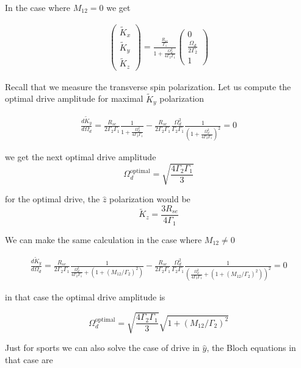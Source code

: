 \documentclass{article}
\begin{document}
In the case where $M_{12}=0$ we get

\begin{align}
    \left(\begin{array}{c}
        \tilde{K}_{x}\\
        \tilde{K}_{y}\\
        \tilde{K}_{z} 
    \end{array}\right)=
    \frac{\frac{R_{se}}{\Gamma_1}}{1+\frac{\Omega_d^2}{4\Gamma_2\Gamma_1}}
    \left(\begin{array}{c}
      0 \\
       \frac{\Omega_d}{2\Gamma_2}\\
         1
    \end{array}\right)
\end{align}

Recall that we measure the transverse spin polarization. Let us compute the optimal drive amplitude for maximal $\tilde{K}_y$ polarization

\begin{align}
    \frac{d\tilde{K}_{y}}{d \Omega_d} = \frac{R_{se}}{2\Gamma_2\Gamma_1}\frac{1}{1+\frac{\Omega_d^2}{4\Gamma_2\Gamma_1}} - \frac{R_{se}}{2\Gamma_2\Gamma_1}\frac{\Omega_d^2}{\Gamma_2\Gamma_1} \frac{1}{\left(1+\frac{\Omega_d^2}{4\Gamma_2\Gamma_1}\right)^2}=0
\end{align}

we get the next optimal drive amplitude $$\Omega_d^{\text{optimal}} = \sqrt{\frac{4\Gamma_2\Gamma_1}{3}}$$

for the optimal drive, the $\hat{z}$ polarization would be
$$\tilde{K}_{z} = \frac{3R_{se}}{4\Gamma_1}$$

We can make the same calculation in the case where $M_{12}\neq 0$

\begin{align}
    \frac{d\tilde{K}_{y}}{d \Omega_d} = \frac{R_{se}}{2\Gamma_2\Gamma_1}\frac{1}{\frac{\Omega_d^2}{4\Gamma_2\Gamma_1} + \left(1 + \left(M_{12}/\Gamma_2\right)^2\right)} - \frac{R_{se}}{2\Gamma_2\Gamma_1}\frac{\Omega_d^2}{\Gamma_2\Gamma_1} \frac{1}{\left(\frac{\Omega_d^2}{4\Gamma_2\Gamma_1} + \left(1 + \left(M_{12}/\Gamma_2\right)^2\right)\right)^2}=0
\end{align}

in that case the optimal drive amplitude is

$$\Omega_d^{\text{optimal}} =\sqrt{\frac{4\Gamma_2\Gamma_1}{3}}\sqrt{1 + \left(M_{12}/\Gamma_2\right)^2}$$

Just for sports we can also solve the case of drive in $\hat{y}$, the Bloch equations in that case are
\end{document}
